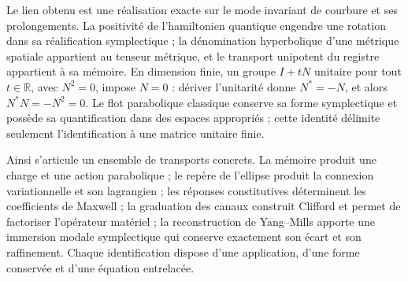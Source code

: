 Le lien obtenu est une réalisation exacte sur le mode invariant de
courbure et ses prolongements. La positivité de l’hamiltonien quantique
engendre une rotation dans sa réalification symplectique ; la dénomination
hyperbolique d’une métrique spatiale appartient au tenseur métrique, et le
transport unipotent du registre appartient à sa mémoire. En dimension
finie, un groupe \(I+tN\) unitaire pour tout \(t\in\mathbb R\), avec
\(N^2=0\), impose \(N=0\) : dériver l’unitarité donne \(N^*=-N\),
et alors \(N^*N=-N^2=0\). Le flot parabolique classique conserve sa
forme symplectique et possède sa quantification dans des espaces appropriés ; cette
identité délimite seulement l’identification à une matrice unitaire finie.

Ainsi s’articule un ensemble de transports concrets. La mémoire
produit une charge et une action parabolique ; le repère de l’ellipse produit
la connexion variationnelle et son lagrangien ; les réponses constitutives
déterminent les coefficients de Maxwell ; la graduation des canaux construit
Clifford et permet de factoriser l’opérateur matériel ; la reconstruction de
Yang--Mills apporte une immersion modale symplectique qui conserve exactement
son écart et son raffinement. Chaque identification dispose d’une application,
d’une forme conservée et d’une équation entrelacée.
